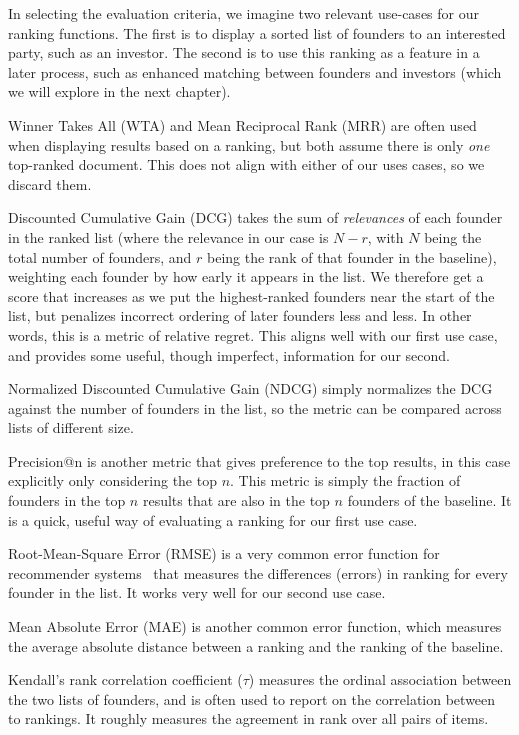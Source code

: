 In selecting the evaluation criteria, we imagine two relevant use-cases for our ranking functions. The first is to display a sorted list of founders to an interested party, such as an investor. The second is to use this ranking as a feature in a later process, such as enhanced matching between founders and investors (which we will explore in the next chapter).

Winner Takes All (WTA) and Mean Reciprocal Rank (MRR) are often used when displaying results based on a ranking, but both assume there is only \textit{one} top-ranked document. This does not align with either of our uses cases, so we discard them.

Discounted Cumulative Gain (DCG) takes the sum of \textit{relevances} of each founder in the ranked list (where the relevance in our case is $N - r$, with $N$ being the total number of founders, and $r$ being the rank of that founder in the baseline), weighting each founder by how early it appears in the list. We therefore get a score that increases as we put the highest-ranked founders near the start of the list, but penalizes incorrect ordering of later founders less and less. In other words, this is a metric of relative regret. This aligns well with our first use case, and provides some useful, though imperfect, information for our second.

Normalized Discounted Cumulative Gain (NDCG) simply normalizes the DCG against the number of founders in the list, so the metric can be compared across lists of different size.

Precision@n is another metric that gives preference to the top results, in this case explicitly only considering the top $n$. This metric is simply the fraction of founders in the top $n$ results that are also in the top $n$ founders of the baseline. It is a quick, useful way of evaluating a ranking for our first use case.

Root-Mean-Square Error (RMSE) is a very common error function for recommender systems~\cite{Cremonesi:2010:PRA:1864708.1864721} that measures the differences (errors) in ranking for every founder in the list. It works very well for our second use case.

Mean Absolute Error (MAE) is another common error function, which measures the average absolute distance between a ranking and the ranking of the baseline.

Kendall's rank correlation coefficient ($\tau$) measures the ordinal association between the two lists of founders, and is often used to report on the correlation between to rankings. It roughly measures the agreement in rank over all pairs of items.

